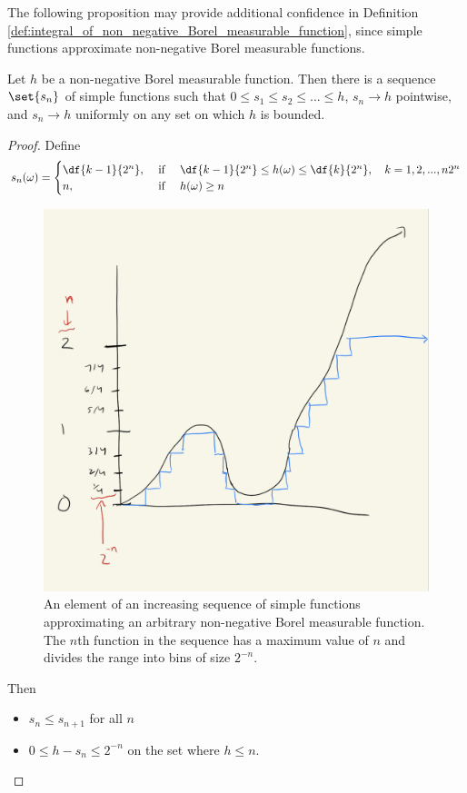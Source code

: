 \documentclass{article} %
\begin{document}

The following proposition may provide additional confidence in Definition \ref{def:integral_of_non_negative_Borel_measurable_function}, since simple functions approximate non-negative Borel measurable functions.

\begin{proposition}
Let $h$ be a non-negative Borel measurable function.  Then there is a sequence $\set{s_n}$ of simple functions such that $0 \leq s_1 \leq s_2 \leq ... \leq h$, $s_n \to h$ pointwise, and $s_n \to h$ uniformly on any set on which $h$ is bounded.	
\label{prop:there_is_a_sequence_of_simple_fucntions_that_increases_to_any_non_negative_borel_measurable_function}
\end{proposition}

\begin{proof}
Define 
\[ s_n(\omega) = 
\begin{cases}
\df{k-1}{2^n}, & \text{ if } \quad \df{k-1}{2^n} \leq h(\omega) \leq \df{k}{2^n},\quad k=1,2,...,n2^n \\
n, & \text{ if } \quad h(\omega) \geq n 
\end{cases}
\]	

\begin{figure}[H]
\centering
\includegraphics[width=.7\textwidth]{images/approximate_nonnegative_with_simple}	
\caption{An element of an increasing sequence of simple functions approximating an arbitrary non-negative Borel measurable function. The $n$th function in the sequence has a maximum value of $n$ and divides the range into bins of size $2^{-n}$.}
\end{figure}


Then 
\begin{itemize}
\item $s_n \leq s_{n+1}$ for all $n$
\item $0 \leq h - s_n \leq 2^{-n}$ on the set where $h \leq n$.
\end{itemize}


\end{proof}
\end{document}

